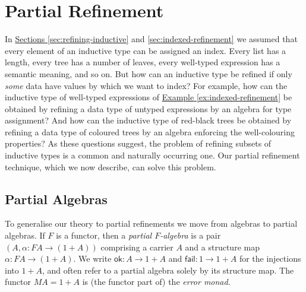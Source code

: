 \documentclass{LMCS}
\newcommand{\ok}{\mathsf{ok}}
\newcommand{\fail}{\mathsf{fail}}
\begin{document}
\section{Partial Refinement}\label{sec:partial-refinement}

In \hyperref[sec:refining-inductive]{Sections
  \ref*{sec:refining-inductive}} and
\hyperref[sec:indexed-refinement]{ \ref*{sec:indexed-refinement}} we
assumed that every element of an inductive type can be assigned an
index. Every list has a length, every tree has a number of leaves,
every well-typed expression has a semantic meaning, and so on. But how
can an inductive type be refined if only {\em some} data have values
by which we want to index?  For example, how can the inductive type of
well-typed expressions of \hyperref[ex:indexed-refinement]{Example
  \ref*{ex:indexed-refinement}} be obtained by refining a data type of
untyped expressions by an algebra for type assignment? And how can the
inductive type of red-black trees be obtained by refining a data type
of coloured trees by an algebra enforcing the well-colouring
properties? As these questions suggest, the problem of refining
subsets of inductive types is a common and naturally occurring
one. Our partial refinement technique, which we now describe, can
solve this problem.

\subsection{Partial Algebras}

To generalise our theory to partial refinements we move from algebras
to partial algebras. If $F$ is a functor, then a {\em partial
  $F$-algebra} is a pair $(A, \alpha : FA \to (1+A))$ comprising a
carrier $A$ and a structure map $\alpha : FA \to (1+A)$. We write
$\ok:A \to 1+A$ and $\fail:1 \to 1+A$ for the injections into $1+A$,
and often refer to a partial algebra solely by its structure map. The
functor $MA = 1+A$ is (the functor part of) the {\em error monad}.
\end{document}
